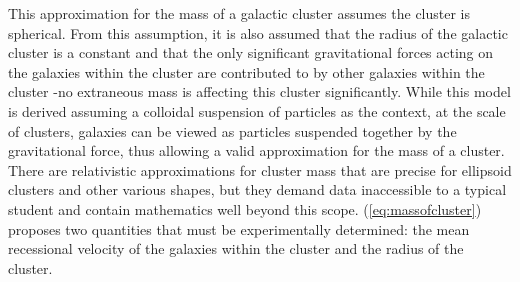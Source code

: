 \documentclass[12pt]{article}
\begin{document}
This approximation for the mass of a galactic cluster assumes the cluster is spherical. From this assumption, it is also assumed that the radius of the galactic cluster is a constant and that the only significant gravitational forces acting on the galaxies within the cluster are contributed to by other galaxies within the cluster -no extraneous mass is affecting this cluster significantly. While this model is derived assuming a colloidal suspension of particles as the context, at the scale of clusters, galaxies can be viewed as particles suspended together by the gravitational force, thus allowing a valid approximation for the mass of a cluster. There are relativistic approximations for cluster mass that are precise for ellipsoid clusters and other various shapes, but they demand data inaccessible to a typical student and contain mathematics well beyond this scope\cite{libretexts}. (\ref{eq:massofcluster}) proposes two quantities that must be experimentally determined: the mean recessional velocity of the galaxies within the cluster and the radius of the cluster.
\end{document}

